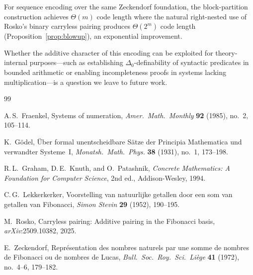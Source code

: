 \documentclass[11pt]{amsart}
\theoremstyle{plain}
\theoremstyle{definition}
\theoremstyle{remark}
\begin{document}
For sequence encoding over the same Zeckendorf foundation, the block-partition construction achieves $\Theta(m)$ code length where the natural right-nested use of Rosko's binary carryless pairing produces $\Theta(2^m)$ code length (Proposition~\ref{prop:blowup}), an exponential improvement.

Whether the additive character of this encoding can be exploited for theory-internal purposes---such as establishing $\Delta_0$-definability of syntactic predicates in bounded arithmetic or enabling incompleteness proofs in systems lacking multiplication---is a question we leave to future work.


\begin{thebibliography}{99}

A.\,S.~Fraenkel, Systems of numeration, \textit{Amer.\ Math.\ Monthly} \textbf{92} (1985), no.~2, 105--114.

K.~G\"odel, \"Uber formal unentscheidbare S\"atze der Principia Mathematica und verwandter Systeme~I, \textit{Monatsh.\ Math.\ Phys.} \textbf{38} (1931), no.~1, 173--198.

R.\,L.~Graham, D.\,E.~Knuth, and O.~Patashnik, \textit{Concrete Mathematics: A Foundation for Computer Science}, 2nd ed., Addison-Wesley, 1994.

C.\,G.~Lekkerkerker, Voorstelling van natuurlijke getallen door een som van getallen van Fibonacci, \textit{Simon Stevin} \textbf{29} (1952), 190--195.

M.~Rosko, Carryless pairing: Additive pairing in the Fibonacci basis, \textit{arXiv}:2509.10382, 2025.

E.~Zeckendorf, Repr\'esentation des nombres naturels par une somme de nombres de Fibonacci ou de nombres de Lucas, \textit{Bull.\ Soc.\ Roy.\ Sci.\ Li\`ege} \textbf{41} (1972), no.~4--6, 179--182.

\end{thebibliography}
\end{document}

